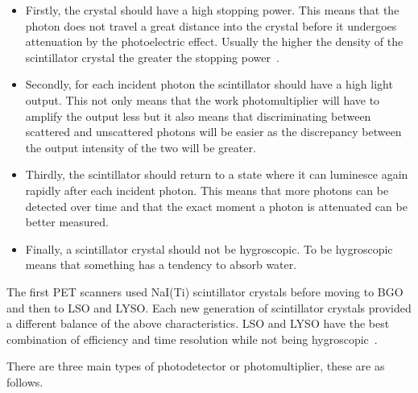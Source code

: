                 \begin{itemize}
                    \item Firstly, the crystal should have a high stopping power. This means that the photon does not travel a great distance into the crystal before it undergoes attenuation by the photoelectric effect. Usually the higher the density of the scintillator crystal the greater the stopping power~\parencite{Derenzo2003TheScintillator}.
                    
                    \item Secondly, for each incident photon the scintillator should have a high light output. This not only means that the work photomultiplier will have to amplify the output less but it also means that discriminating between scattered and unscattered photons will be easier as the discrepancy between the output intensity of the two will be greater.

                    \item Thirdly, the scintillator should return to a state where it can luminesce again rapidly after each incident photon. This means that more photons can be detected over time and that the exact moment a photon is attenuated can be better measured.
                    
                    \item Finally, a scintillator crystal should not be hygroscopic. To be hygroscopic means that something has a tendency to absorb water.
                \end{itemize}
                
                The first \gls{PET} scanners used \gls{NaI(Ti)} scintillator crystals before moving to \gls{BGO} and then to \gls{LSO} and \gls{LYSO}. Each new generation of scintillator crystals provided a different balance of the above characteristics. \gls{LSO} and \gls{LYSO} have the best combination of efficiency and time resolution while not being hygroscopic~\parencite{BGOCherenkovBib, ScintilatorsBib, Mao2013CrystalCrystals}.
                
                There are three main types of photodetector or photomultiplier, these are as follows.
                
